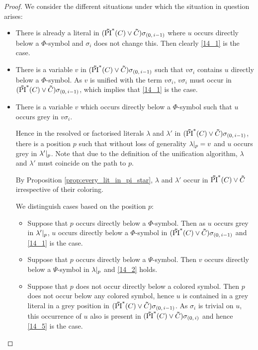 \documentclass[%
	draft=false,%
	numbers=noendperiod,%
	11pt,%
	a4paper,%
	oneside,%
	openany,%
]{memoir}
\begin{document}
\begin{proof}
	We consider the different situations under which the situation in question arises:

	\begin{itemize}
		\item
			There is already a literal in $(\bm\tilde{\operatorname{PI}}^{*}(C)\lor \bm\tilde{C})\sigma_{(0,\,i-1)}$ where $u$ occurs directly below a $\Phi$-symbol and $\sigma_i$ does not change this.
			Then clearly \ref{14_1} is the case.

		\item
			There is a variable $v$ in $(\bm\tilde{\operatorname{PI}}^{*}(C)\lor \bm\tilde{C})\sigma_{(0,\,i-1)}$ such that $v\sigma_i$ contains $u$ directly below a $\Phi$-symbol.
			As $v$ is unified with the term $v\sigma_i$, $v\sigma_i$ must occur in $(\bm\tilde{\operatorname{PI}}^{*}(C)\lor \bm\tilde{C})\sigma_{(0,\,i-1)}$, which implies that \ref{14_1} is the case.

		\item
			There is a variable $v$ which occurs directly below a $\Phi$-symbol such that $u$ occurs grey in $v\sigma_i$.

			Hence in the resolved or factorised literals $\lambda$ and $\lambda'$ in $(\bm\tilde{\operatorname{PI}}^{*}(C)\lor \bm\tilde{C})\sigma_{(0,\,i-1)}$, there is a position $p$ such that without loss of generality $\lambda|_{p} = v$ and $u$ occurs grey in $\lambda'|_{p}$. 
			Note that due to the definition of the unification algorithm, $\lambda$ and $\lambda'$ must coincide on the path to $p$.

			By Proposition \ref{prop:every_lit_in_pi_star}, $\lambda$ and $\lambda'$ occur in $\bm\tilde{\operatorname{PI}}^{*}(C)\lor \bm\tilde{C}$ irrespective of their coloring.

			We distinguish cases based on the position $p$:

			\begin{itemize}
				\item Suppose that $p$ occurs directly below a $\Phi$-symbol.
					Then as $u$ occurs grey in  $\lambda'|_{p}$, $u$ occurs directly below a $\Phi$-symbol in $(\bm\tilde{\operatorname{PI}}^{*}(C)\lor \bm\tilde{C})\sigma_{(0,\,i-1)}$ and \ref{14_1} is the case.

				\item Suppose that $p$ occurs directly below a $\Psi$-symbol.
					Then $v$ occurs directly below a $\Psi$-symbol in $\lambda|_{p}$ and  \ref{14_2} holds.

				\item
					Suppose that $p$ does not occur directly below a colored symbol.
					Then $p$ does not occur below any colored symbol, hence $u$ is contained in a grey literal in a grey position in $(\bm\tilde{\operatorname{PI}}^{*}(C)\lor \bm\tilde{C})\sigma_{(0,\,i-1)}$. 
					As $\sigma_i$ is trivial on $u$, this occurrence of $u$ also is present in $(\bm\tilde{\operatorname{PI}}^{*}(C)\lor \bm\tilde{C})\sigma_{(0,\,i)}$ and hence \ref{14_5} is the case.
					\qedhere

			\end{itemize}
	\end{itemize}

\end{proof}
\end{document}
